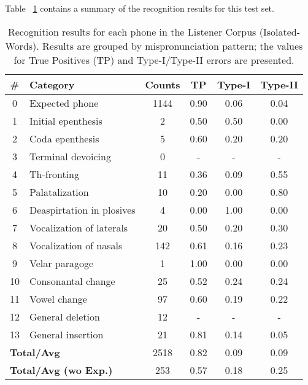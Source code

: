 \documentclass[twocolumn]{bmcart}%
\begin{document}
Table ~\ref{rec-listener-words} contains a summary of the recognition results for this test set.

\small
\setlength{\tabcolsep}{0.3em}
\begin{table}[ht!]
\caption{Recognition results for each phone in the Listener Corpus (Isolated-Words). Results are grouped by mispronunciation pattern; the values for True Positives (TP) and Type-I/Type-II errors are presented.}
\begin{tabular}{clcccc} \hline
\textbf{\#} & \textbf{Category} & \textbf{Counts} & \textbf{TP} & \textbf{Type-I} & \textbf{Type-II} \\ \hline
0 & Expected phone & 1144 & 0.90 & 0.06 & 0.04 \\ 
1 & Initial epenthesis & 2 & 0.50 & 0.50 & 0.00 \\ 
2 & Coda epenthesis & 5 & 0.60 & 0.20 & 0.20 \\ 
3 & Terminal devoicing & 0 & - & - & - \\ 
4 & Th-fronting & 11 & 0.36 & 0.09 & 0.55 \\ 
5 & Palatalization & 10 & 0.20 & 0.00 & 0.80 \\ 
6 & Deaspirtation in plosives & 4 & 0.00 & 1.00 & 0.00 \\ 
7 & Vocalization of laterals & 20 & 0.50 & 0.20 & 0.30 \\ 
8 & Vocalization of nasals & 142 & 0.61 & 0.16 & 0.23 \\ 
9 & Velar paragoge & 1 & 1.00 & 0.00 & 0.00 \\ 
10 & Consonantal change & 25 & 0.52 & 0.24 & 0.24 \\ 
11 & Vowel change & 97 & 0.60 & 0.19 & 0.22 \\ 
12 & General deletion & 12 & - & - & - \\ 
13 & General insertion & 21 & 0.81 & 0.14 & 0.05 \\ \hline 
\multicolumn{2}{l}{\textbf{Total/Avg}} & 2518 & 0.82 & 0.09 & 0.09 \\ 
\multicolumn{2}{l}{\textbf{Total/Avg (wo Exp.)}} & 253 & 0.57 & 0.18 & 0.25 \\ \hline
\end{tabular}
\label{rec-listener-words}
\end{table}
\normalsize
\end{document}
